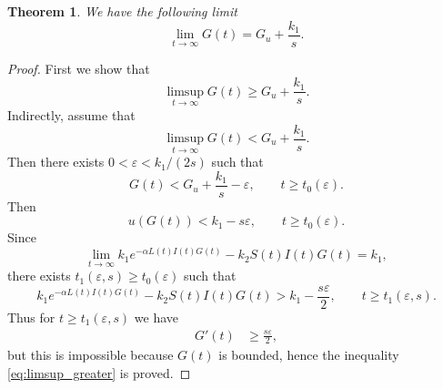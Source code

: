 \documentclass[pdflatex,sn-mathphys-num]{sn-jnl}
\theoremstyle{thmstyleone}
\newtheorem{theorem}{Theorem}[section]
\theoremstyle{thmstyletwo}
\theoremstyle{thmstylethree}
\begin{document}
\begin{theorem}\label{thm:lim_G}
We have the following limit 
\begin{equation*}
{\lim_{t\to\infty} G(t)=G_u+\frac{k_1}{s}.}
\end{equation*} 
\end{theorem}
\begin{proof}
First we show that 
\begin{equation}\label{eq:limsup_greater}
\limsup_{t\to\infty} G(t)\geq G_u+\frac{k_1}{s}.
\end{equation}
Indirectly, assume that 
\begin{equation}
\limsup_{t\to\infty} G(t)<G_u+\frac{k_1}{s}.
\end{equation}
Then there exists $0<\varepsilon<k_1/(2s)$ such that 
\begin{equation}
G(t)<G_u+\frac{k_1}{s}-\varepsilon,\qquad t\geq t_0(\varepsilon).
\end{equation}
Then 
\begin{equation}
u(G(t))<k_1-s\varepsilon,\qquad t\geq t_0(\varepsilon).
\end{equation}
Since 
\begin{equation}
\lim_{t\to\infty} k_1e^{-\alpha L(t)I(t)G(t)}-k_2S(t)I(t)G(t)=k_1,
\end{equation}
there exists $t_1(\varepsilon,s)\geq t_0(\varepsilon)$
such that 
\begin{equation}
k_1e^{-\alpha L(t)I(t)G(t)}-k_2S(t)I(t)G(t)>k_1-\frac{s\varepsilon}{2}
, \qquad t\geq t_1(\varepsilon,s).
\end{equation}
Thus for $t\geq t_1(\varepsilon,s)$ we have
\begin{align*}
G'(t) &\geq \frac{s\varepsilon}{2},
\end{align*}
but this is impossible because $G(t)$ is bounded, hence 
the inequality \eqref{eq:limsup_greater} is proved.


\end{proof}
\end{document}
